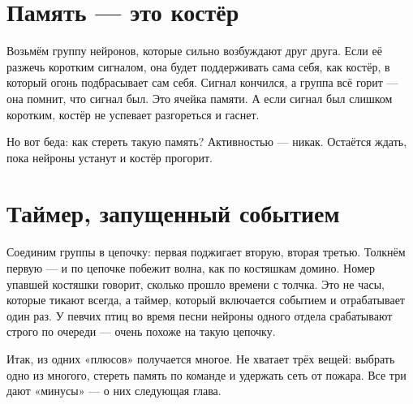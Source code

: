 \section*{Память --- это костёр}

Возьмём группу нейронов, которые сильно возбуждают друг друга. Если её разжечь коротким сигналом, она будет поддерживать сама себя, как костёр, в который огонь подбрасывает сам себя. Сигнал кончился, а группа всё горит --- она помнит, что сигнал был. Это ячейка памяти. А если сигнал был слишком коротким, костёр не успевает разгореться и гаснет.

Но вот беда: как стереть такую память? Активностью --- никак. Остаётся ждать, пока нейроны устанут и костёр прогорит.

\section*{Таймер, запущенный событием}

Соединим группы в цепочку: первая поджигает вторую, вторая третью. Толкнём первую --- и по цепочке побежит волна, как по костяшкам домино. Номер упавшей костяшки говорит, сколько прошло времени с толчка. Это не часы, которые тикают всегда, а таймер, который включается событием и отрабатывает один раз. У певчих птиц во время песни нейроны одного отдела срабатывают строго по очереди --- очень похоже на такую цепочку.

Итак, из одних «плюсов» получается многое. Не хватает трёх вещей: выбрать одно из многого, стереть память по команде и удержать сеть от пожара. Все три дают «минусы» --- о них следующая глава.

